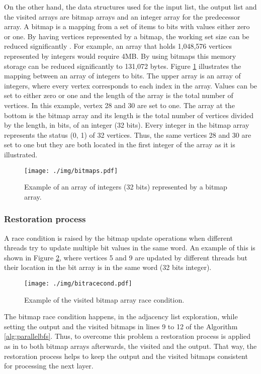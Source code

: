 \documentclass{sig-alternate-05-2015}
\begin{document}
On the other hand, the data structures used for the input list, the
output list and the visited arrays are bitmap arrays and an integer
array for the predecessor array. A bitmap is a mapping from a set of
items to bits with values either zero or one. By having vertices
represented by a bitmap, the working set size can be reduced
significantly \cite{Agarwal}. For example, an array that holds
1,048,576 vertices represented by integers would require 4MB. By using
bitmaps this memory storage can be reduced significantly to 131,072
bytes. Figure \ref{fig:race} illustrates the mapping between an array
of integers to bits. The upper array is an array of integers, where
every vertex corresponds to each index in the array. Values can be set
to either zero or one and the length of the array is the total number
of vertices. In this example, vertex 28 and 30 are set to one. The
array at the bottom is the bitmap array and its length is the total
number of vertices divided by the length, in bits, of an integer (32
bits). Every integer in the bitmap array represents the status (0, 1)
of 32 vertices. Thus, the same vertices 28 and 30 are set to one but
they are both located in the first integer of the array as it is
illustrated.
 \begin{figure}
\centering
\texttt{[image: ./img/bitmaps.pdf]}
\caption{Example of an array of integers (32 bits) represented by a bitmap array.}
\label{fig:race}
\vspace{-3mm}
\end{figure}

\subsubsection{Restoration process}
\label{sec:atomic}
A race condition is raised by the bitmap update operations when
different threads try to update multiple bit values in the same
word. An example of this is shown in Figure \ref{fig:bitrace}, where
vertices 5 and 9 are updated by different threads but their location
in the bit array is in the same word (32 bits integer).
\begin{figure}
\centering
\texttt{[image: ./img/bitracecond.pdf]}
\caption{Example of the visited bitmap array race condition.}
\label{fig:bitrace}
\vspace{-3mm}
\end{figure}
The bitmap race condition happens, in the adjacency list exploration, while setting the output and the visited bitmaps in lines 9 to 12 of the Algorithm \ref{alg:parallelbfs}. Thus, to overcome this problem a restoration process is applied as in \cite{MICgraphs} to both bitmap arrays afterwards, the visited and the output. That way, the restoration process helps to keep the output and the visited bitmaps consistent for processing the next layer. 
\end{document}
